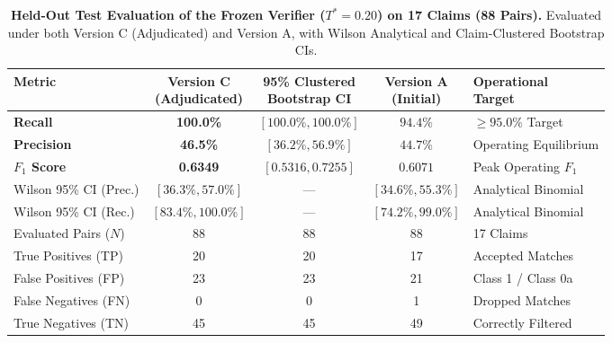 \documentclass[11pt,a4paper]{article}
\begin{document}
\begin{table}[htbp]
\centering
\small
\caption{\textbf{Held-Out Test Evaluation of the Frozen Verifier ($T^* = 0.20$) on 17 Claims (88 Pairs).} Evaluated under both Version C (Adjudicated) and Version A, with Wilson Analytical and Claim-Clustered Bootstrap CIs.}
\label{tab:heldout_test_metrics}
\begin{adjustbox}{max width=\linewidth}
\begin{tabular}{l c c c l}
\toprule
\textbf{Metric} & \makecell{\textbf{Version C}\\\textbf{(Adjudicated)}} & \makecell{\textbf{95\% Clustered}\\\textbf{Bootstrap CI}} & \makecell{\textbf{Version A}\\\textbf{(Initial)}} & \makecell{\textbf{Operational}\\\textbf{Target}} \\
\midrule
\textbf{Recall} & \textbf{100.0\%} & $[100.0\%, 100.0\%]$ & $94.4\%$ & $\ge 95.0\%$ Target \\
\textbf{Precision} & \textbf{46.5\%} & $[36.2\%, 56.9\%]$ & $44.7\%$ & Operating Equilibrium \\
\textbf{$F_1$ Score} & \textbf{0.6349} & $[0.5316, 0.7255]$ & $0.6071$ & Peak Operating $F_1$ \\
Wilson 95\% CI (Prec.) & $[36.3\%, 57.0\%]$ & --- & $[34.6\%, 55.3\%]$ & Analytical Binomial \\
Wilson 95\% CI (Rec.) & $[83.4\%, 100.0\%]$ & --- & $[74.2\%, 99.0\%]$ & Analytical Binomial \\
\midrule
Evaluated Pairs ($N$) & 88 & 88 & 88 & 17 Claims \\
True Positives (TP) & 20 & 20 & 17 & Accepted Matches \\
False Positives (FP) & 23 & 23 & 21 & Class 1 / Class 0a \\
False Negatives (FN) & 0 & 0 & 1 & Dropped Matches \\
True Negatives (TN) & 45 & 45 & 49 & Correctly Filtered \\
\bottomrule
\end{tabular}
\end{adjustbox}
\end{table}
\end{document}
